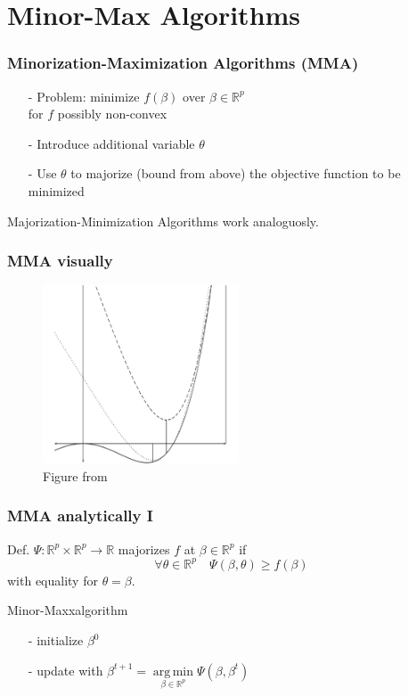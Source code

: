 \documentclass{beamer}
\newcommand{\R}{\mathbb{R}}
\DeclareMathOperator*{\argmin}{arg\,min}
\begin{document}
\section{Minor-Max Algorithms}

\begin{frame}
\frametitle{Minorization-Maximization Algorithms (MMA)}
\begin{itemize}
\item[-] Problem: minimize $f(\beta)$ over $\beta\in\R^p$\\ for $f$ possibly non-convex
\item[-] Introduce additional variable $\theta$
\item[-] Use $\theta$ to majorize (bound from above) the objective function to be minimized
\end{itemize}


{\small Majorization-Minimization Algorithms work analoguosly.}
\end{frame}

\begin{frame}
\frametitle{MMA visually}
\begin{figure}
\includegraphics[height=150pt]{img/minmaxalgo2.png}
\caption{Figure from \cite{DL15}}
\end{figure}

\end{frame}

\begin{frame}
\frametitle{MMA analytically I}
Def. 
$\Psi:\R^p\times\R^p\to\R$ {\color{blue}majorizes} $f$ at $\beta\in\R^p$ if \[\forall\theta\in\R^p\quad \Psi(\beta,\theta)\ge f(\beta)\]
with equality for $\theta=\beta$.
\vspace{10pt}

Minor-Maxxalgorithm
\begin{itemize}
\item[-] initialize $\beta^0$
\item[-] update with $\beta^{t+1}=\argmin\limits_{\beta\in\R^p}\Psi(\beta,\beta^t)$
\end{itemize}
\end{frame}
\end{document}
